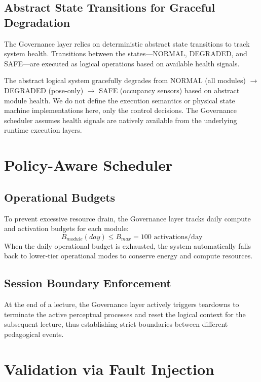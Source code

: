 \documentclass[conference]{IEEEtran}
\begin{document}
\subsection{Abstract State Transitions for Graceful Degradation}
The Governance layer relies on deterministic abstract state transitions to track system health. Transitions between the states—NORMAL, DEGRADED, and SAFE—are executed as logical operations based on available health signals.

The abstract logical system gracefully degrades from NORMAL (all modules) $\to$ DEGRADED (pose-only) $\to$ SAFE (occupancy sensors) based on abstract module health. We do not define the execution semantics or physical state machine implementations here, only the control decisions. The Governance scheduler assumes health signals are natively available from the underlying runtime execution layers.

\section{Policy-Aware Scheduler}

\subsection{Operational Budgets}
To prevent excessive resource drain, the Governance layer tracks daily compute and activation budgets for each module:
\begin{equation}
B_{module}(day) \leq B_{max} = 100 \text{ activations/day}
\end{equation}
When the daily operational budget is exhausted, the system automatically falls back to lower-tier operational modes to conserve energy and compute resources.

\subsection{Session Boundary Enforcement}
At the end of a lecture, the Governance layer actively triggers teardowns to terminate the active perceptual processes and reset the logical context for the subsequent lecture, thus establishing strict boundaries between different pedagogical events.

\section{Validation via Fault Injection}
\end{document}
